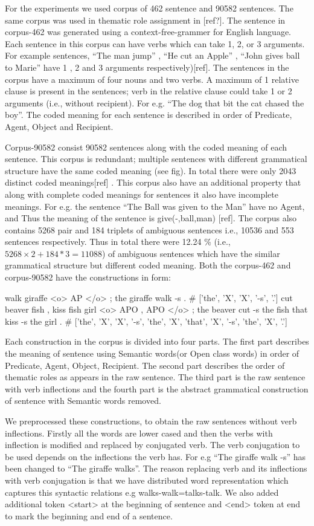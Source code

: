 For the experiments we used corpus of 462 sentence and 90582 sentences. The same corpus was used in thematic role assignment in [ref?]. The sentence in corpus-462 was generated using a context-free-grammer for English language. Each sentence in this corpus can have verbs which can take 1, 2, or 3 arguments. For example sentences, “The man jump” , “He cut an Apple” , “John gives ball to Marie” have 1 , 2 and 3 arguments respectively)[ref]. The sentences in the corpus have a maximum of four nouns and two verbs. A maximum of 1 relative clause is present in the sentences; verb in the relative clause could take 1 or 2 arguments (i.e., without recipient). For e.g. “The dog that bit the cat chased the boy”. The coded meaning for each sentence is described in order of Predicate, Agent, Object and Recipient. 

	Corpus-90582 consist 90582 sentences along with the coded meaning of each sentence. This corpus is redundant; multiple sentences with different grammatical structure have the same coded meaning (see fig). In total there were only 2043 distinct coded meanings[ref] . This corpus also have an additional property that along with complete coded meanings for sentences it also have incomplete meanings. For e.g. the sentence “The Ball was given to the Man” have no Agent, and Thus the meaning of the sentence is give(-,ball,man) [ref]. The corpus also contains 5268 pair and 184 triplets of ambiguous sentences i.e., 10536 and 553 sentences respectively. Thus in total there were 12.24 \% (i.e., $ 5268 \times 2+184*3=11088 $) of ambiguous sentences which have the similar grammatical structure but different coded meaning. 
Both the corpus-462 and corpus-90582 have the constructions in form:

walk giraffe <o> AP </o> ; the giraffe walk -s . \# ['the', 'X', 'X', '-s', '.']
cut beaver fish , kiss fish girl <o> APO , APO </o> ; the beaver cut -s the fish that kiss -s the girl . \# ['the', 'X', 'X', '-s', 'the', 'X', 'that', 'X', '-s', 'the', 'X', '.']

Each construction in the corpus is divided into four parts. The first part describes the meaning of sentence using Semantic words(or Open class words) in order of Predicate, Agent, Object, Recipient. The second part describes the order of thematic roles as appears in the raw sentence. The third part is the raw sentence with verb inflections and the fourth part is the abstract grammatical construction of sentence with Semantic words removed.

	We preprocessed these constructions, to obtain the raw sentences without verb inflections. Firstly all the words are lower cased and then the verbs with inflection is modified and replaced by conjugated verb. The verb conjugation to be used depends on the inflections the verb has. For e.g “The giraffe walk -s” has been changed to “The giraffe walks”. The reason replacing verb and its inflections with verb conjugation is that we have distributed word representation which captures this syntactic relations e.g walks-walk=talks-talk. We also added additional token <start> at the beginning of sentence and <end> token at end to mark the beginning and end of a sentence.
  
